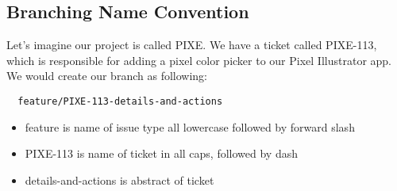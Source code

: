 \subsection { Branching Name Convention }
Let's imagine our project is called PIXE. We have a ticket called PIXE-113,
which is responsible for adding a pixel color picker to our Pixel Illustrator
app. We would create our branch as following:

\begin{verbatim}
  feature/PIXE-113-details-and-actions
\end{verbatim}

\begin{itemize}
  \item feature is name of issue type all lowercase followed by forward slash
  \item PIXE-113 is name of ticket in all caps, followed by dash
  \item details-and-actions is abstract of ticket
\end{itemize} 
